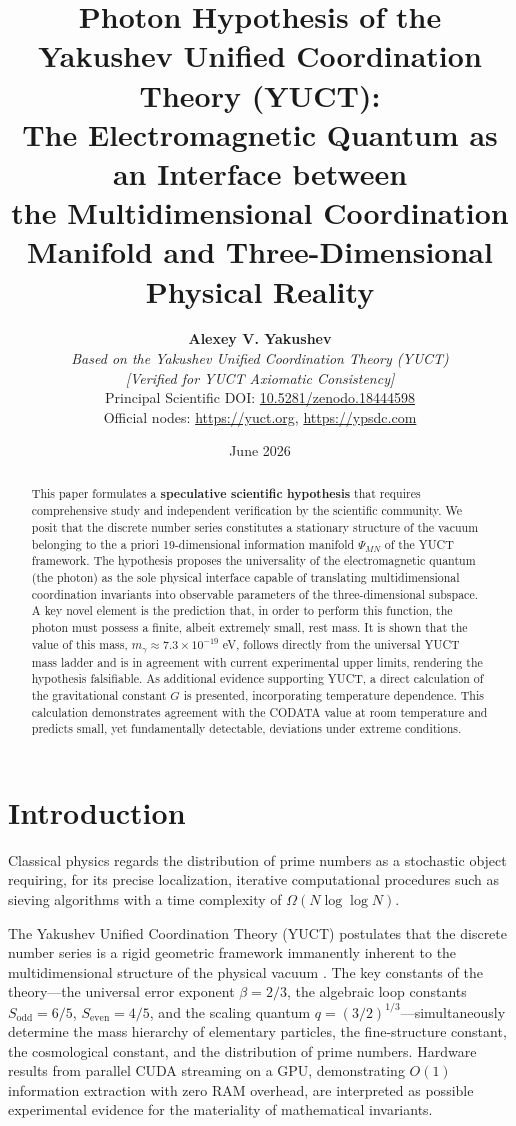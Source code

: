 \documentclass[11pt,a4paper]{article}
\title{\textbf{Photon Hypothesis of the Yakushev Unified Coordination Theory (YUCT):\\
		The Electromagnetic Quantum as an Interface between\\
		the Multidimensional Coordination Manifold and Three-Dimensional Physical Reality}}
\author{\textbf{Alexey V. Yakushev} \\
	\small\textit{Based on the Yakushev Unified Coordination Theory (YUCT)} \\
	\small\textit{[Verified for YUCT Axiomatic Consistency]} \\
	\small Principal Scientific DOI: \href{https://doi.org/10.5281/zenodo.18444598}{10.5281/zenodo.18444598} \\
	\small Official nodes: \url{https://yuct.org}, \url{https://ypsdc.com}}
\date{June 2026}
\begin{document}
	
	\maketitle
	
	\begin{abstract}
		This paper formulates a \textbf{speculative scientific hypothesis} that requires comprehensive study and independent verification by the scientific community. We posit that the discrete number series constitutes a stationary structure of the vacuum belonging to the a priori 19-dimensional information manifold $\Psi_{MN}$ of the YUCT framework. The hypothesis proposes the universality of the electromagnetic quantum (the photon) as the sole physical interface capable of translating multidimensional coordination invariants into observable parameters of the three-dimensional subspace. A key novel element is the prediction that, in order to perform this function, the photon must possess a finite, albeit extremely small, rest mass. It is shown that the value of this mass, $m_\gamma \approx 7.3 \times 10^{-19}$ eV, follows directly from the universal YUCT mass ladder and is in agreement with current experimental upper limits, rendering the hypothesis falsifiable. As additional evidence supporting YUCT, a direct calculation of the gravitational constant $G$ is presented, incorporating temperature dependence. This calculation demonstrates agreement with the CODATA value at room temperature and predicts small, yet fundamentally detectable, deviations under extreme conditions.
	\end{abstract}
	
	\section{Introduction}
	Classical physics regards the distribution of prime numbers as a stochastic object requiring, for its precise localization, iterative computational procedures such as sieving algorithms with a time complexity of $\Omega(N \log \log N)$.
	
	The Yakushev Unified Coordination Theory (YUCT) postulates that the discrete number series is a rigid geometric framework immanently inherent to the multidimensional structure of the physical vacuum \cite{yuct_zenodo}. The key constants of the theory—the universal error exponent $\beta = 2/3$, the algebraic loop constants $S_{\mathrm{odd}} = 6/5$, $S_{\mathrm{even}} = 4/5$, and the scaling quantum $q = (3/2)^{1/3}$—simultaneously determine the mass hierarchy of elementary particles, the fine-structure constant, the cosmological constant, and the distribution of prime numbers. Hardware results from parallel CUDA streaming on a GPU, demonstrating $O(1)$ information extraction with zero RAM overhead, are interpreted as possible experimental evidence for the materiality of mathematical invariants.
	
\end{document}
